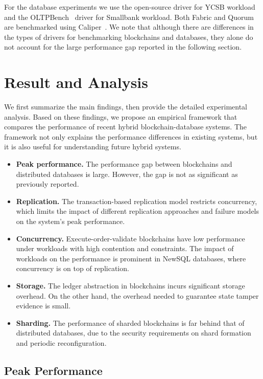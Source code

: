 For the database experiments we use the open-source driver for YCSB workload~\cite{web:ycsb} and 
the OLTPBench~\cite{difallah2013oltp} driver for Smallbank workload.  Both Fabric and Quorum are
benchmarked using Caliper~\cite{web:caliper}. We note that although there are differences in the types of
drivers for benchmarking blockchains and databases, they alone do not account for the large performance gap
reported in the following section. 

\section{Result and Analysis}
\label{sec:twin:exp}
We first summarize the main findings, then provide the detailed experimental analysis. Based on these findings,
we propose an empirical framework that compares the performance of recent hybrid blockchain-database systems.
The framework not only explains the performance differences in existing systems, but it is also useful for
understanding future hybrid systems.

\begin{itemize}
  \item \textbf{Peak performance.} The performance gap between blockchains and distributed databases is large. However, the gap is not as significant as previously reported.
  \item \textbf{Replication. }
    The transaction-based replication model restricts concurrency, which limits the impact of different
	replication approaches and failure models on the system's peak performance. 
  \item \textbf{Concurrency.} Execute-order-validate blockchains have low performance under workloads with high contention and constraints.
  The impact of workloads on the performance is prominent in NewSQL databases, where concurrency is
  on top of replication.
  \item \textbf{Storage. } The ledger abstraction in blockchains incurs significant storage overhead. On the
  other hand, the overhead needed to guarantee state tamper evidence is small.
  \item \textbf{Sharding. } The performance of sharded blockchains is far behind that of distributed
  databases, due to the security requirements on shard formation and periodic reconfiguration.
\end{itemize}

\subsection {Peak Performance}
